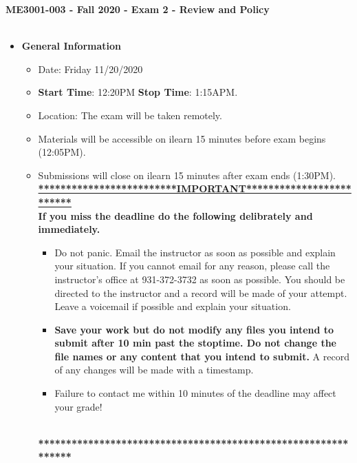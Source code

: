\documentclass[11pt]{article}
\newcommand{\EXAMNUM}{2}
\begin{document}
\textbf{ \LARGE ME3001-003 - Fall 2020 - Exam \EXAMNUM\hspace{2mm} - Review and Policy  } \\\\

\begin{itemize}
	\item  \textbf{\Large General Information}

	\begin{itemize}

		\item Date: Friday 11/20/2020
		\item {\bf Start Time}: 12:20PM {\bf Stop Time}: 1:15APM.
		\item Location: The exam will be taken remotely. 
		 
		\item Materials will be accessible on ilearn 15 minutes before exam begins (12:05PM).
		\item Submissions will close on ilearn 15 minutes after exam ends (1:30PM). \vspace{1mm}\\
		
		{\R  \bf \underline{*************************IMPORTANT*************************}} \vspace{3mm}\\
			  {\R \bf If you miss the deadline do the following delibrately and immediately. }
		\begin{itemize}
			\item Do not panic. Email the instructor as soon as possible and explain your situation. If you cannot email for any reason, please call the instructor's office at 931-372-3732 as soon as possible. You should be directed to the instructor and a record will be made of your attempt. Leave a voicemail if possible and explain your situation.
			\item{\bf  Save your work but do not modify any files you intend to submit after 10 min past the stoptime. Do not change the file names or any content that you intend to submit.} A record of any changes will be made with a timestamp. \vspace{2mm}
			\item {\R Failure to contact me within 10 minutes of the deadline may affect your grade!}
		\end{itemize}
			{\R  \bf \underline{\hspace{140mm}}} \\
			{\R  \bf ***************************************************************} 
	\end{itemize}


\end{itemize}
\end{document}
